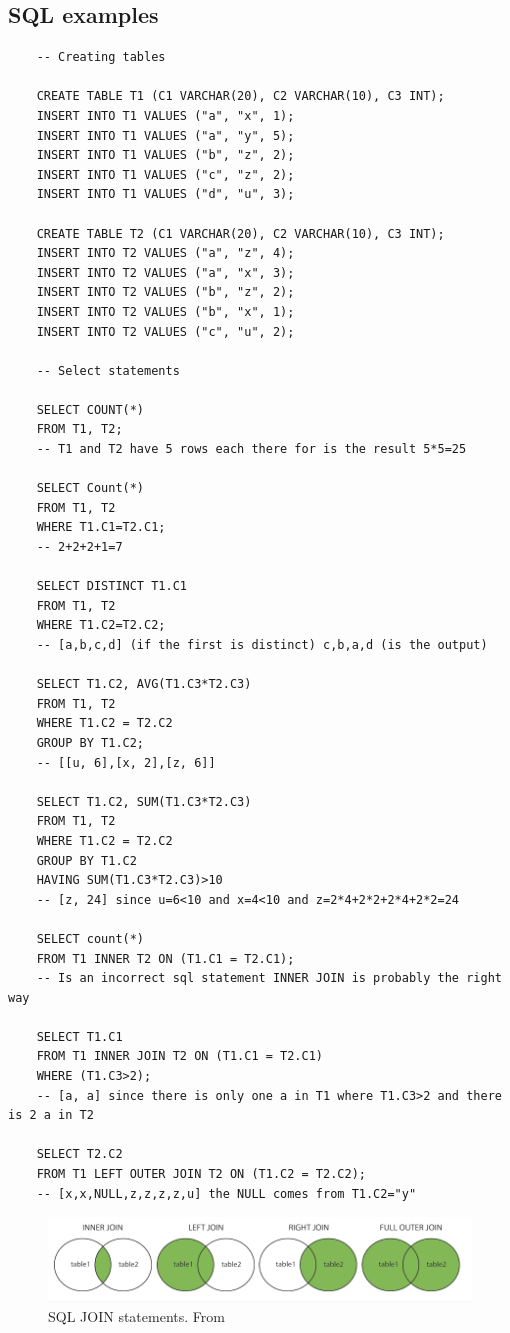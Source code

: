 \subsection{SQL examples}
\begin{verbatim}
    -- Creating tables

    CREATE TABLE T1 (C1 VARCHAR(20), C2 VARCHAR(10), C3 INT);
    INSERT INTO T1 VALUES ("a", "x", 1);
    INSERT INTO T1 VALUES ("a", "y", 5);
    INSERT INTO T1 VALUES ("b", "z", 2);
    INSERT INTO T1 VALUES ("c", "z", 2);
    INSERT INTO T1 VALUES ("d", "u", 3);

    CREATE TABLE T2 (C1 VARCHAR(20), C2 VARCHAR(10), C3 INT);
    INSERT INTO T2 VALUES ("a", "z", 4);
    INSERT INTO T2 VALUES ("a", "x", 3);
    INSERT INTO T2 VALUES ("b", "z", 2);
    INSERT INTO T2 VALUES ("b", "x", 1);
    INSERT INTO T2 VALUES ("c", "u", 2);

    -- Select statements
    
    SELECT COUNT(*)
    FROM T1, T2; 
    -- T1 and T2 have 5 rows each there for is the result 5*5=25

    SELECT Count(*)
    FROM T1, T2
    WHERE T1.C1=T2.C1; 
    -- 2+2+2+1=7

    SELECT DISTINCT T1.C1
    FROM T1, T2
    WHERE T1.C2=T2.C2;
    -- [a,b,c,d] (if the first is distinct) c,b,a,d (is the output)

    SELECT T1.C2, AVG(T1.C3*T2.C3)
    FROM T1, T2
    WHERE T1.C2 = T2.C2
    GROUP BY T1.C2;
    -- [[u, 6],[x, 2],[z, 6]]

    SELECT T1.C2, SUM(T1.C3*T2.C3)
    FROM T1, T2
    WHERE T1.C2 = T2.C2
    GROUP BY T1.C2
    HAVING SUM(T1.C3*T2.C3)>10  
    -- [z, 24] since u=6<10 and x=4<10 and z=2*4+2*2+2*4+2*2=24 

    SELECT count(*)
    FROM T1 INNER T2 ON (T1.C1 = T2.C1);  
    -- Is an incorrect sql statement INNER JOIN is probably the right way

    SELECT T1.C1
    FROM T1 INNER JOIN T2 ON (T1.C1 = T2.C1)
    WHERE (T1.C3>2);
    -- [a, a] since there is only one a in T1 where T1.C3>2 and there is 2 a in T2

    SELECT T2.C2
    FROM T1 LEFT OUTER JOIN T2 ON (T1.C2 = T2.C2);
    -- [x,x,NULL,z,z,z,z,u] the NULL comes from T1.C2="y"

\end{verbatim}
\begin{figure}[!h]
    \centering
    \includegraphics[width=12cm]{image/sql_joins.png}
    \caption{SQL JOIN statements. From \cite{}}
    \label{fig:sql_joins}
\end{figure}


